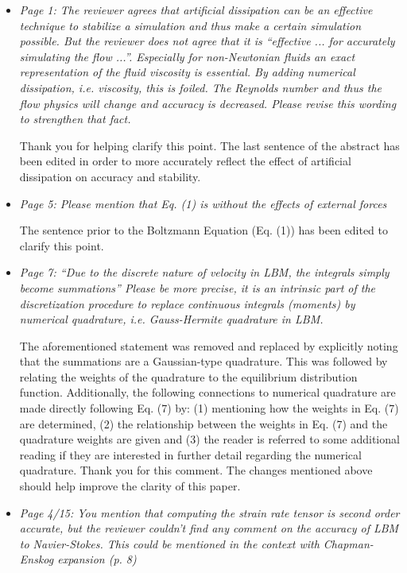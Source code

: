 \documentclass{article}
\begin{document}
	\begin{itemize}
		
	\item \emph{Page 1: The reviewer agrees that artificial dissipation can be an effective technique
		to stabilize a simulation and thus make a certain simulation possible. But the
		reviewer does not agree that it is “effective ... for accurately simulating the flow ...”.
		Especially for non-Newtonian fluids an exact representation of the fluid viscosity is
		essential. By adding numerical dissipation, i.e. viscosity, this is foiled. The Reynolds
		number and thus the flow physics will change and accuracy is decreased. Please
		revise this wording to strengthen that fact.}
	
	Thank you for helping clarify this point. The last sentence of the abstract has been edited in order to more accurately reflect the effect of artificial dissipation on accuracy and stability.
	
	\item \emph{Page 5: Please mention that Eq. (1) is without the effects of external forces}
	
	The sentence prior to the Boltzmann Equation (Eq. (1)) has been edited to clarify this point.
	
	\item \emph{Page 7: ``Due to the discrete nature of velocity in LBM, the integrals simply become
		summations'' Please be more precise, it is an intrinsic part of the discretization
		procedure to replace continuous integrals (moments) by numerical quadrature, i.e.
		Gauss-Hermite quadrature in LBM.}
	
	The aforementioned statement was removed and replaced by explicitly noting that the summations are a Gaussian-type quadrature.
	This was followed by relating the weights of the quadrature to the equilibrium distribution function.
	Additionally, the following connections to numerical quadrature are made directly following Eq. (7) by: (1) mentioning how the weights in Eq. (7) are determined, (2) the relationship between the weights in Eq. (7) and the quadrature weights are given and (3) the reader is referred to some additional reading if they are interested in further detail regarding the numerical quadrature.
	Thank you for this comment.
	The changes mentioned above should help improve the clarity of this paper.
	
	\item \emph{Page 4/15: You mention that computing the strain rate tensor is second order
		accurate, but the reviewer couldn’t find any comment on the accuracy of LBM to
		Navier-Stokes. This could be mentioned in the context with Chapman-Enskog
		expansion (p. 8)}
	

\end{itemize}
\end{document}
